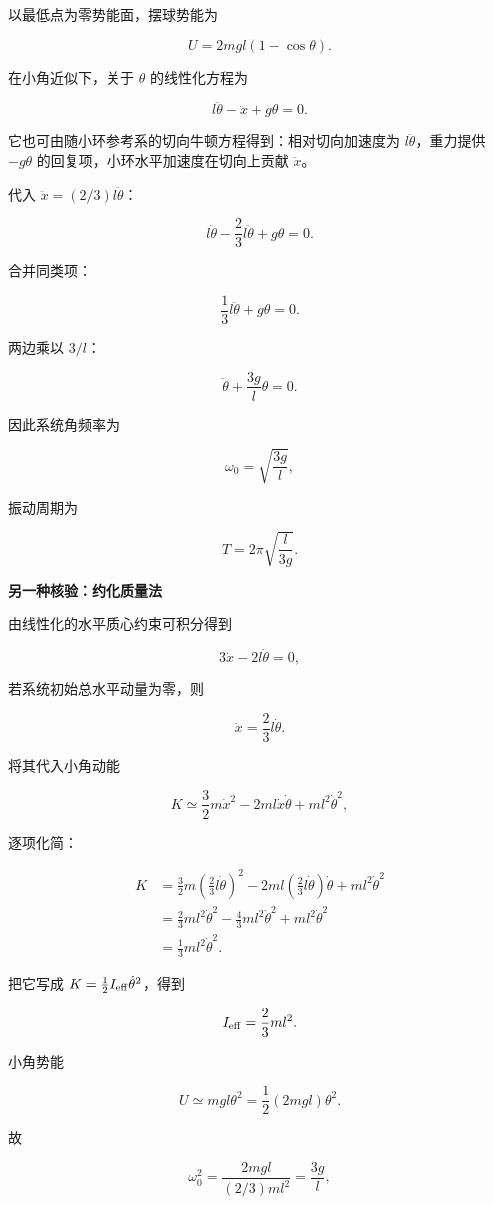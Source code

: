 \documentclass[12pt,a4paper,UTF8]{ctexart}
\begin{document}
以最低点为零势能面，摆球势能为

\[U=2mgl(1-\cos\theta).\]

在小角近似下，关于 \(\theta\) 的线性化方程为

\[
l\ddot\theta-\ddot x+g\theta=0.
\]

它也可由随小环参考系的切向牛顿方程得到：相对切向加速度为
\(l\ddot\theta\)，重力提供 \(-g\theta\)
的回复项，小环水平加速度在切向上贡献 \(\ddot x\)。

代入 \(\ddot x=(2/3)l\ddot\theta\)：

\[
l\ddot\theta-\frac23l\ddot\theta+g\theta=0.
\]

合并同类项：

\[
\frac13l\ddot\theta+g\theta=0.
\]

两边乘以 \(3/l\)：

\[
\boxed{\ddot\theta+\frac{3g}{l}\theta=0}.
\]

因此系统角频率为

\[
\omega_0=\sqrt{\frac{3g}{l}},
\]

振动周期为

\[
\boxed{T=2\pi\sqrt{\frac{l}{3g}}}.
\]

\textbf{另一种核验：约化质量法}

由线性化的水平质心约束可积分得到

\[3\dot x-2l\dot\theta=0,\]

若系统初始总水平动量为零，则

\[\dot x=\frac23l\dot\theta.\]

将其代入小角动能

\[K\simeq\frac32m\dot x^2-2ml\dot x\dot\theta+ml^2\dot\theta^2,\]

逐项化简：

\[
\begin{aligned}
K
&=\frac32m\left(\frac23l\dot\theta\right)^2
-2ml\left(\frac23l\dot\theta\right)\dot\theta
+ml^2\dot\theta^2\\
&=\frac23ml^2\dot\theta^2-\frac43ml^2\dot\theta^2+ml^2\dot\theta^2\\
&=\frac13ml^2\dot\theta^2.
\end{aligned}
\]

把它写成 \(K=\frac12I_{\rm eff}\dot\theta^2\)，得到

\[I_{\rm eff}=\frac23ml^2.\]

小角势能

\[U\simeq mgl\theta^2=\frac12(2mgl)\theta^2.\]

故

\[\omega_0^2=\frac{2mgl}{(2/3)ml^2}=\frac{3g}{l},\]
\end{document}
